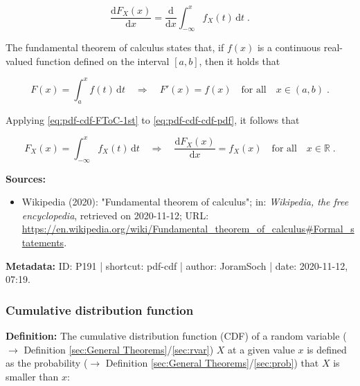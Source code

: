 \documentclass[a4paper,12pt,twoside]{book}
\begin{document}
\begin{equation} \label{eq:pdf-cdf-ddx-cdf}
\frac{\mathrm{d}F_X(x)}{\mathrm{d}x} = \frac{\mathrm{d}}{\mathrm{d}x} \int_{-\infty}^{x} f_X(t) \, \mathrm{d}t \; .
\end{equation}

The fundamental theorem of calculus states that, if $f(x)$ is a continuous real-valued function defined on the interval $[a,b]$, then it holds that

\begin{equation} \label{eq:pdf-cdf-FToC-1st}
F(x) = \int_{a}^{x} f(t) \, \mathrm{d}t \quad \Rightarrow \quad F'(x) = f(x) \quad \text{for all} \quad x \in (a,b) \; .
\end{equation}

Applying \eqref{eq:pdf-cdf-FToC-1st} to \eqref{eq:pdf-cdf-cdf-pdf}, it follows that

\begin{equation} \label{eq:pdf-cdf-pdf-cdf-qed}
F_X(x) = \int_{-\infty}^{x} f_X(t) \, \mathrm{d}t \quad \Rightarrow \quad \frac{\mathrm{d}F_X(x)}{\mathrm{d}x} = f_X(x) \quad \text{for all} \quad x \in \mathbb{R} \; .
\end{equation}


\vspace{1em}
\textbf{Sources:}
\begin{itemize}
\item Wikipedia (2020): "Fundamental theorem of calculus"; in: \textit{Wikipedia, the free encyclopedia}, retrieved on 2020-11-12; URL: \url{https://en.wikipedia.org/wiki/Fundamental_theorem_of_calculus#Formal_statements}.
\end{itemize}


\vspace{1em}
\textbf{Metadata:} ID: P191 | shortcut: pdf-cdf | author: JoramSoch | date: 2020-11-12, 07:19.
\vspace{1em}



\subsubsection[\textit{Cumulative distribution function}]{Cumulative distribution function} \label{sec:cdf}
\setcounter{equation}{0}

\textbf{Definition:} The cumulative distribution function (CDF) of a random variable ($\rightarrow$ Definition \ref{sec:General Theorems}/\ref{sec:rvar}) $X$ at a given value $x$ is defined as the probability ($\rightarrow$ Definition \ref{sec:General Theorems}/\ref{sec:prob}) that $X$ is smaller than $x$:
\end{document}
